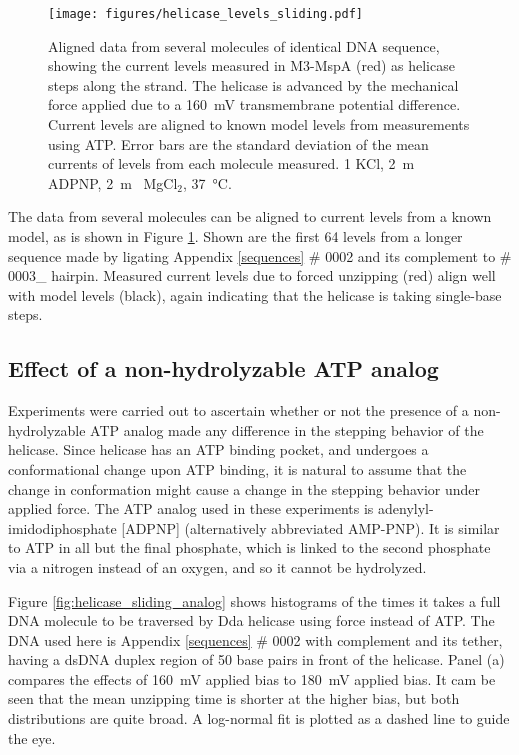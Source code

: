 \begin{figure}[h]
\begin{centering}
\texttt{[image: figures/helicase\_levels\_sliding.pdf]}
\caption[Mechanical force results in the same current levels]{Aligned data from several molecules of identical DNA sequence, showing the current levels measured in M3-MspA (red) as helicase steps along the strand.  The helicase is advanced by the mechanical force applied due to a \SI{160}{\mV} transmembrane potential difference.  Current levels are aligned to known model levels from measurements using ATP.  Error bars are the standard deviation of the mean currents of levels from each molecule measured.  \SI{1}{\Molar} KCl, \SI{2}{\m\Molar} ADPNP, \SI{2}{\m\Molar} MgCl$_2$, \SI{37}{\celsius}.}
\label{fig:helicase_force_stepping_2}
\end{centering}
\end{figure}

The data from several molecules can be aligned to current levels from a known model, as is shown in Figure \ref{fig:helicase_force_stepping_2}.  Shown are the first \num{64} levels from a longer sequence made by ligating Appendix \ref{sequences} \# 0002 and its complement to \# 0003\_ hairpin.  Measured current levels due to forced unzipping (red) align well with model levels (black), again indicating that the helicase is taking single-base steps.

\subsection{Effect of a non-hydrolyzable ATP analog}

Experiments were carried out to ascertain whether or not the presence of a non-hydrolyzable ATP analog made any difference in the stepping behavior of the helicase.  Since helicase has an ATP binding pocket, and undergoes a conformational change upon ATP binding, it is natural to assume that the change in conformation might cause a change in the stepping behavior under applied force.  The ATP analog used in these experiments is adenylyl-imidodiphosphate [ADPNP] (alternatively abbreviated AMP-PNP).  It is similar to ATP in all but the final phosphate, which is linked to the second phosphate via a nitrogen instead of an oxygen, and so it cannot be hydrolyzed.

Figure \ref{fig:helicase_sliding_analog} shows histograms of the times it takes a full DNA molecule to be traversed by Dda helicase using force instead of ATP.  The DNA used here is Appendix \ref{sequences} \# 0002 with complement and its tether, having a dsDNA duplex region of \num{50} base pairs in front of the helicase.  Panel (a) compares the effects of \SI{160}{\mV} applied bias to \SI{180}{\mV} applied bias.  It cam be seen that the mean unzipping time is shorter at the higher bias, but both distributions are quite broad.  A log-normal fit is plotted as a dashed line to guide the eye.

